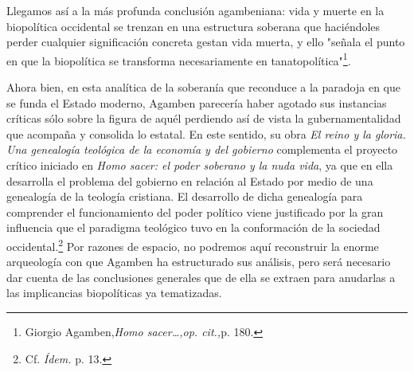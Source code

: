 \documentclass{book}
\begin{document}
Llegamos así a la más profunda conclusión agambeniana: vida y muerte en
la biopolítica occidental se trenzan en una estructura soberana que
haciéndoles perder cualquier significación concreta gestan vida muerta,
y ello "señala el punto en que la biopolítica se transforma
necesariamente en tanatopolítica"\footnote{Giorgio Agamben,\emph{Homo
  sacer\ldots,op. cit.,}p. 180.}.

Ahora bien, en esta analítica de la soberanía que reconduce a la
paradoja en que se funda el Estado moderno, Agamben parecería haber
agotado sus instancias críticas sólo sobre la figura de aquél perdiendo
así de vista la gubernamentalidad que acompaña y consolida lo estatal.
En este sentido, su obra \emph{El reino y la gloria. Una genealogía
teológica de la economía y del gobierno} complementa el proyecto crítico
iniciado en \emph{Homo sacer: el poder soberano y la nuda vida}, ya que
en ella desarrolla el problema del gobierno en relación al Estado por
medio de una genealogía de la teología cristiana. El desarrollo de dicha
genealogía para comprender el funcionamiento del poder político viene
justificado por la gran influencia que el paradigma teológico tuvo en la
conformación de la sociedad occidental.\footnote{Cf. \emph{Ídem.} p. 13.}
Por razones de espacio, no podremos aquí reconstruir la enorme
arqueología con que Agamben ha estructurado sus análisis, pero será
necesario dar cuenta de las conclusiones generales que de ella se
extraen para anudarlas a las implicancias biopolíticas ya tematizadas.
\end{document}
